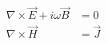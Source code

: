 \begin{equation}
\begin{split}
    \nabla \times \vec{E} + i \omega\vec{B} &= 0 \\
    \nabla \times \vec{H} &= \vec{J}
\end{split}
\label{eq:maxwell_freq_quasi}
\end{equation}
